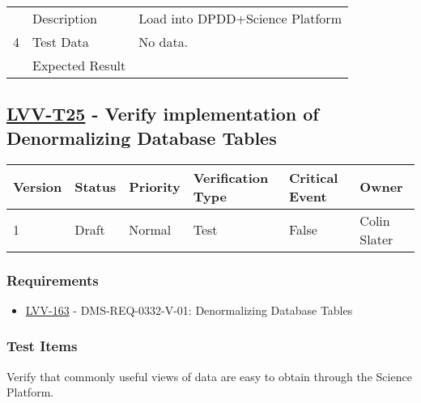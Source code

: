 \begin{longtable}[]{p{1.3cm}p{2cm}p{13cm}}
        \\ \midrule

            \multirow{3}{*}{ 4 } & Description &
            \begin{minipage}[t]{13cm}{\footnotesize
            Load into DPDD+Science Platform

            \vspace{\dp0}
            } \end{minipage} \\ \cline{2-3}
            & Test Data &
            \begin{minipage}[t]{13cm}{\footnotesize
                No data.
                \vspace{\dp0}
            } \end{minipage} \\ \cline{2-3}
            & Expected Result &
        \\ \midrule
    \end{longtable}

\subsection{\href{https://jira.lsstcorp.org/secure/Tests.jspa\#/testCase/LVV-T25}{LVV-T25}
    - Verify implementation of Denormalizing Database Tables}\label{lvv-t25}

\begin{longtable}[]{llllll}
\toprule
Version & Status & Priority & Verification Type & Critical Event & Owner
\\\midrule
1 & Draft & Normal &
Test & False & Colin Slater
\\\bottomrule
\end{longtable}

\subsubsection{Requirements}
\begin{itemize}
\item \href{https://jira.lsstcorp.org/browse/LVV-163}{LVV-163} - DMS-REQ-0332-V-01: Denormalizing Database Tables
\end{itemize}

\subsubsection{Test Items}
Verify that commonly useful views of data are easy to obtain through the
Science Platform.



